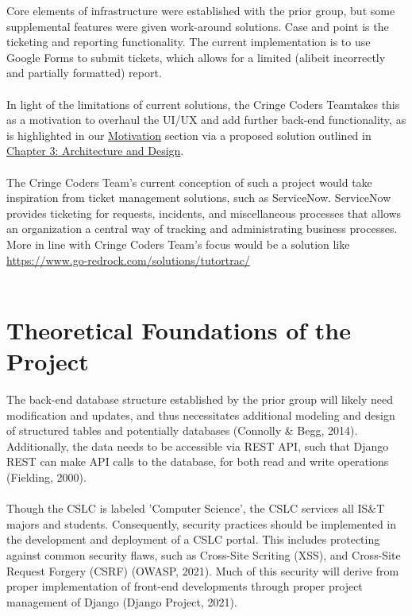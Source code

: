 \documentclass[oneside,openany,obeyspaces]{book}
\newcommand\tab[1][1cm]{\hspace*{#1}}
\newcommand\TeamName{Cringe Coders Team}
\begin{document}
\begin{flushleft}
    \tab Core elements of infrastructure were established with the prior group, but some supplemental features were given work-around solutions. Case and point is the ticketing and reporting functionality. The current implementation is to use Google Forms to submit tickets, which allows for a limited (alibeit incorrectly and partially formatted) report.\\~\\

    \tab In light of the limitations of current solutions, the \TeamName\space takes this as a motivation to overhaul the UI/UX and add further back-end functionality, as is highlighted in our \hyperref[sec:Motivation]{Motivation} section via a proposed solution outlined in \hyperref[chp:Architecture and Design]{Chapter 3: Architecture and Design}.\\~\\
    \tab The \TeamName's current conception of such a project would take inspiration from ticket management solutions, such as ServiceNow. ServiceNow provides ticketing for requests, incidents, and miscellaneous processes that allows an organization a central way of tracking and administrating business processes. More in line with \TeamName's focus would be a solution like \url{https://www.go-redrock.com/solutions/tutortrac/}\\~\\

    \section{Theoretical Foundations of the Project}

    \tab The back-end database structure established by the prior group will likely need modification and updates, and thus necessitates additional modeling and design of structured tables and potentially databases (Connolly \& Begg, 2014). Additionally, the data needs to be accessible via REST API, such that Django REST can make API calls to the database, for both read and write operations (Fielding, 2000).\\~\\

    \tab Though the CSLC is labeled 'Computer Science', the CSLC services all IS\&T majors and students. Consequently, security practices should be implemented in the development and deployment of a CSLC portal. This includes protecting against common security flaws, such as Cross-Site Scriting (XSS),  and Cross-Site Request Forgery (CSRF) (OWASP, 2021). Much of this security will derive from proper implementation of front-end developments through proper project management of Django (Django Project, 2021).\\~\\



\end{flushleft}
\end{document}
